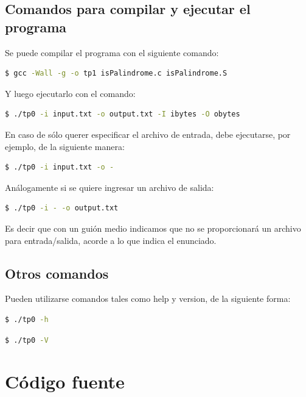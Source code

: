 \documentclass[a4paper]{article}
\begin{document}
\subsection{Comandos para compilar y ejecutar el programa}

Se puede compilar el programa con el siguiente comando:

\begin{lstlisting}[language=bash]
  $ gcc -Wall -g -o tp1 isPalindrome.c isPalindrome.S
\end{lstlisting}


Y luego ejecutarlo con el comando:

\begin{lstlisting}[language=bash]
  $ ./tp0 -i input.txt -o output.txt -I ibytes -O obytes
\end{lstlisting}

En caso de sólo querer especificar el archivo de entrada, debe ejecutarse, por ejemplo, de la siguiente manera:

\begin{lstlisting}[language=bash]
  $ ./tp0 -i input.txt -o -
\end{lstlisting}

Análogamente si se quiere ingresar un archivo de salida:

\begin{lstlisting}[language=bash]
  $ ./tp0 -i - -o output.txt
\end{lstlisting}

Es decir que con un guión medio indicamos que no se proporcionará un archivo para entrada/salida, acorde a lo que indica el enunciado.

\subsection{Otros comandos}

Pueden utilizarse comandos tales como help y version, de la siguiente forma:

\begin{lstlisting}[language=bash]
  $ ./tp0 -h
\end{lstlisting}

\begin{lstlisting}[language=bash]
  $ ./tp0 -V
\end{lstlisting}

\section{Código fuente}
\end{document}
